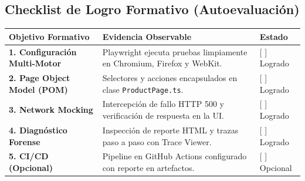 \documentclass[10pt,letterpaper]{article}
\begin{document}
\subsection{Checklist de Logro Formativo (Autoevaluación)}
\small
\begin{tabularx}{\textwidth}{|L{4.2cm}|X|C{2.5cm}|}
\hline
{}
\textbf{Objetivo Formativo} & \textbf{Evidencia Observable} & \textbf{Estado} \\ \hline
\textbf{1. Configuración Multi-Motor} & Playwright ejecuta pruebas limpiamente en Chromium, Firefox y WebKit. & [ ] Logrado \\ \hline
\textbf{2. Page Object Model (POM)} & Selectores y acciones encapsulados en clase \texttt{ProductPage.ts}. & [ ] Logrado \\ \hline
\textbf{3. Network Mocking} & Intercepción de fallo HTTP 500 y verificación de respuesta en la UI. & [ ] Logrado \\ \hline
\textbf{4. Diagnóstico Forense} & Inspección de reporte HTML y trazas paso a paso con Trace Viewer. & [ ] Logrado \\ \hline
\textbf{5. CI/CD (Opcional)} & Pipeline en GitHub Actions configurado con reporte en artefactos. & [ ] Opcional \\ \hline
\end{tabularx}
\end{document}

